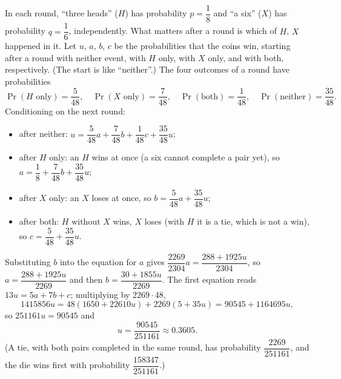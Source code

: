 In each round, ``three heads'' ($H$) has probability $p=\dfrac18$ and ``a six'' ($X$) has probability $q=\dfrac16$, independently. What matters after a round is which of $H$, $X$ happened in it. Let $u$, $a$, $b$, $c$ be the probabilities that the coins win, starting after a round with neither event, with $H$ only, with $X$ only, and with both, respectively. (The start is like ``neither''.) The four outcomes of a round have probabilities
\[\Pr(H\text{ only})=\dfrac{5}{48},\quad\Pr(X\text{ only})=\dfrac{7}{48},\quad\Pr(\text{both})=\dfrac1{48},\quad\Pr(\text{neither})=\dfrac{35}{48}.\]
Conditioning on the next round:
\begin{itemize}
\item after neither: $u=\dfrac5{48}a+\dfrac7{48}b+\dfrac1{48}c+\dfrac{35}{48}u$;
\item after $H$ only: an $H$ wins at once (a six cannot complete a pair yet), so $a=\dfrac18+\dfrac7{48}b+\dfrac{35}{48}u$;
\item after $X$ only: an $X$ loses at once, so $b=\dfrac5{48}a+\dfrac{35}{48}u$;
\item after both: $H$ without $X$ wins, $X$ loses (with $H$ it is a tie, which is not a win), so $c=\dfrac{5}{48}+\dfrac{35}{48}u$.
\end{itemize}
Substituting $b$ into the equation for $a$ gives $\dfrac{2269}{2304}a=\dfrac{288+1925u}{2304}$, so $a=\dfrac{288+1925u}{2269}$ and then $b=\dfrac{30+1855u}{2269}$. The first equation reads $13u=5a+7b+c$; multiplying by $2269\cdot48$,
\[1415856u=48(1650+22610u)+2269(5+35u)=90545+1164695u,\]
so $251161u=90545$ and
\[u=\boxed{\dfrac{90545}{251161}}\approx0.3605.\]
(A tie, with both pairs completed in the same round, has probability $\dfrac{2269}{251161}$, and the die wins first with probability $\dfrac{158347}{251161}$.)
